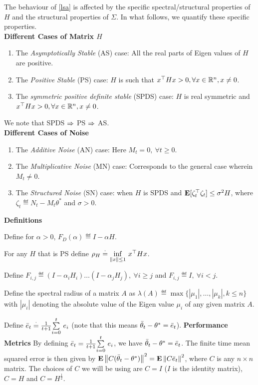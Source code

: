 The behaviour of \eqref{lsa} is affected by the specific spectral/structural properties of $H$ and the structural properties of $\Sigma$.
In what follows, we quantify these specific properties.\\
\textbf{Different Cases of Matrix $H$}
\begin{enumerate}[label=(\roman*)]
\item The \emph{Asymptotically Stable} (AS) case: All the real parts of Eigen values of $H$ are positive.
\item The \emph{Positive Stable} (PS) case: $H$ is such that $x^\top H x>0, \forall x\in \R^n,x\neq 0$.
\item The \emph{symmetric positive definite stable} (SPDS) case: $H$ is real symmetric and $x^\top Hx>0, \forall x\in \R^n, x\neq 0$.
\end{enumerate}
We note that SPDS $\Ra$ PS $\Ra$ AS.\\
\textbf{Different Cases of Noise}
\begin{enumerate}[label=(\roman*)]
\item The \emph{Additive Noise} (AN) case: Here $M_t=0, ~\forall t\geq 0$.
\item The \emph{Multiplicative Noise} (MN) case: Corresponds to the general case wherein $M_t\neq 0$.
\item The \emph{Structured Noise} (SN) case: when $H$ is SPDS and $\E[\zeta_t^\top \zeta_t]\leq \sigma^2 H$, where $\zeta_t\eqdef N_t-M_t\theta^*$ and $\sigma>0$.
\end{enumerate}
\textbf{Definitions}
\ber
\item Define for $\alpha>0$, $F_D(\alpha)\eqdef I-\alpha H$.
\item For any $H$ that is PS define $\rho_H \eqdef \us{\inf}{\norm{x}\leq 1 } x^\top H x$.
\item Define $F_{i,j}\eqdef (I-\alpha_i H_i)\ldots (I-\alpha_j H_j),~\forall i\geq j$ and $F_{i,j}\eqdef I,~\forall i<j$.
\item Define the spectral radius of a matrix $A$ as $\lambda(A) \eqdef \max\{|\mu_1|,\ldots,|\mu_k|,k\leq n\}$ with $|\mu_i|$ denoting the absolute value of the Eigen value $\mu_i$ of any given matrix $A$.
\item Define $\eb_t\eqdef\frac{1}{t+1}\ous{\sum}{i=0}{t} e_i$ (note that this means $\tb_t-\ts=\eb_t$).
\eer
\textbf{Performance Metrics} By defining $\eb_t=\frac{1}{t+1}\ous{\sum}{i=0}{t} e_i$, we have $\tb_t-\ts=\eb_t$. The finite time mean squared error is then given by $\E\norm{C(\tb_t-\ts)}^2=\E\norm{C\eb_t}^2$, where $C$ is any $n\times n$ matrix. The choices of $C$ we will be using are $C=I$ ($I$ is the identity matrix), $C=H$ and $C=H^{\frac{1}{2}}$.\par


